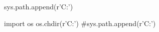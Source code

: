 \documentclass[12pt,a4paper]{article}
\begin{document}
\begin{sympycode}
sys.path.append(r'C:\Users\Murad\evrythg')
\end{sympycode}
\begin{pycode}
import os
os.chdir(r'C:\Users\Murad\evrythg')
#sys.path.append(r'C:\Users\Murad\evrythg')
\end{pycode}
\end{document}
